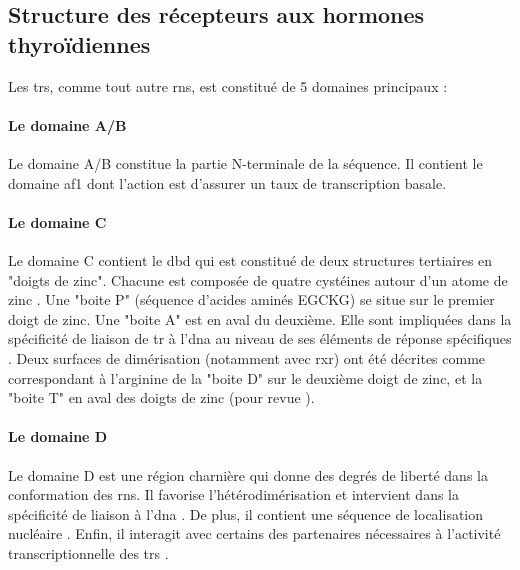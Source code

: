 \subsection{Structure des récepteurs aux hormones thyroïdiennes}\label{subsubsec:struct-tr}
Les \glspl{tr}, comme tout autre \glspl{rn}, est constitué de 5 domaines principaux :

\paragraph{Le domaine A/B}
Le domaine A/B constitue la partie N-terminale de la séquence.
Il contient le domaine \gls{af1} dont l'action est d'assurer un taux de transcription basale.

\paragraph{Le domaine C}
Le domaine C contient le \gls{dbd} qui est constitué de deux structures tertiaires en "doigts de zinc".
Chacune est composée de quatre cystéines autour d'un atome de zinc \citep{Evans1988}.
Une "boite P" (séquence d'acides aminés EGCKG) se situe sur le premier doigt de zinc.
Une "boite A" est en aval du deuxième.
Elle sont impliquées dans la spécificité de liaison de \gls{tr} à l'\gls{dna} au niveau de ses éléments de réponse spécifiques \citep{Nelson1993}.
Deux surfaces de dimérisation (notamment avec \gls{rxr}) ont été décrites comme correspondant à l’arginine de la "boite D" sur le deuxième doigt de zinc, et la "boite T" en aval des doigts de zinc (pour revue \citet{Bain2007}).

\paragraph{Le domaine D}
Le domaine D est une région charnière qui donne des degrés de liberté dans la conformation des \glspl{rn}.
Il favorise l'hétérodimérisation et intervient dans la spécificité de liaison à l'\gls{dna} \citep{Miyamoto2001}.
De plus, il contient une séquence de localisation nucléaire \citep{Hamy1992a}.
Enfin, il interagit avec certains des partenaires nécessaires à l'activité transcriptionnelle des \glspl{tr} \citep{Lin1991,Horlein1995}.

